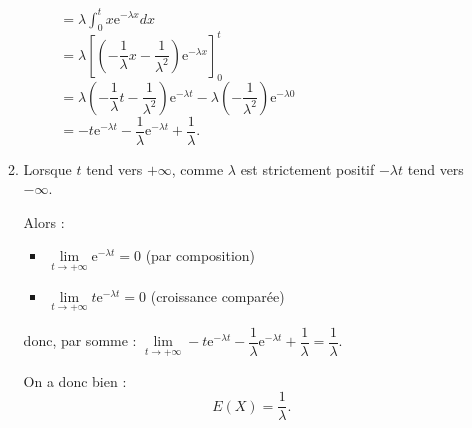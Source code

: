 \begin{corrige}
\begin{enumerate}
\begin{enumerate}[label=\alph*.]
               $\phantom{I(t)} = \lambda\displaystyle\int_{0}^{t} x \text{e}^{-\lambda x}dx$\\
               $\phantom{I(t)} = \lambda \left[\left(-\dfrac{1}{\lambda }x-\dfrac{1}{\lambda ^2}\right)\text{e}^{-\lambda x}\right]_0^t$\\
               $\phantom{I(t)} = \lambda \left(-\dfrac{1}{\lambda }t-\dfrac{1}{\lambda ^2}\right)\text{e}^{-\lambda t} - \lambda\left(-\dfrac{1}{\lambda ^2}\right)\text{e}^{-\lambda 0}$\\
               $\phantom{I(t)} = -t\text{e}^{-\lambda t} - \dfrac{1}{\lambda } \text{e}^{-\lambda t} +\dfrac{1}{\lambda }$.
               \item %
               Lorsque  $t$ tend vers $+\infty $, comme $\lambda $ est strictement positif $-\lambda t$ tend vers $-\infty$.
               \par
               Alors :
               \begin{itemize}
                    \item %
                    $\lim\limits_{t \rightarrow +\infty} \text{e}^{-\lambda t} =0$ (par composition)
                    \item %
                    $\lim\limits_{t \rightarrow +\infty} t\text{e}^{-\lambda t} =0$ (croissance comparée)
               \end{itemize}
               donc, par somme :
               $\lim\limits_{t \rightarrow +\infty}-t\text{e}^{-\lambda t} - \dfrac{1}{\lambda } \text{e}^{-\lambda t} +\dfrac{1}{\lambda } = \dfrac{1}{\lambda }$.
               \par
               On a donc bien :
               \[ E(X) = \dfrac{1}{\lambda }. \]
          \end{enumerate}
     \end{enumerate}
\end{corrige}
